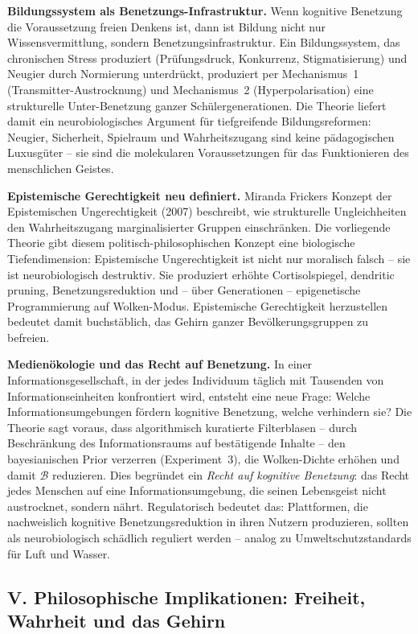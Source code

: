 ﻿\documentclass[12pt,a4paper]{report}
\theoremstyle{plain}
\theoremstyle{definition}
\theoremstyle{remark}
\begin{document}
	\textbf{Bildungssystem als Benetzungs-Infrastruktur.}
	Wenn kognitive Benetzung die Voraussetzung freien Denkens ist,
	dann ist Bildung nicht nur Wissensvermittlung,
	sondern Benetzungsinfrastruktur.
	Ein Bildungssystem, das chronischen Stress produziert
	(Prüfungsdruck, Konkurrenz, Stigmatisierung)
	und Neugier durch Normierung unterdrückt,
	produziert per Mechanismus~1 (Transmitter-Austrocknung)
	und Mechanismus~2 (Hyperpolarisation) eine strukturelle
	Unter-Benetzung ganzer Schülergenerationen.
	Die Theorie liefert damit ein neurobiologisches Argument
	für tiefgreifende Bildungsreformen:
	Neugier, Sicherheit, Spielraum und Wahrheitszugang sind keine
	pädagogischen Luxusgüter -- sie sind die molekularen Voraussetzungen
	für das Funktionieren des menschlichen Geistes.

	\textbf{Epistemische Gerechtigkeit neu definiert.}
	Miranda Frickers Konzept der Epistemischen Ungerechtigkeit
	(2007) beschreibt, wie strukturelle Ungleichheiten den
	Wahrheitszugang marginalisierter Gruppen einschränken.
	Die vorliegende Theorie gibt diesem politisch-philosophischen
	Konzept eine biologische Tiefendimension:
	Epistemische Ungerechtigkeit ist nicht nur moralisch falsch --
	sie ist neurobiologisch destruktiv.
	Sie produziert erhöhte Cortisolspiegel, dendritic pruning,
	Benetzungsreduktion und -- über Generationen -- epigenetische
	Programmierung auf Wolken-Modus.
	Epistemische Gerechtigkeit herzustellen bedeutet damit buchstäblich,
	das Gehirn ganzer Bevölkerungsgruppen zu befreien.

	\textbf{Medienökologie und das Recht auf Benetzung.}
	In einer Informationsgesellschaft, in der jedes Individuum
	täglich mit Tausenden von Informationseinheiten konfrontiert wird,
	entsteht eine neue Frage: Welche Informationsumgebungen fördern
	kognitive Benetzung, welche verhindern sie?
	Die Theorie sagt voraus, dass algorithmisch kuratierte Filterblasen
	-- durch Beschränkung des Informationsraums auf bestätigende Inhalte --
	den bayesianischen Prior verzerren (Experiment~3),
	die Wolken-Dichte erhöhen und damit $\mathcal{B}$ reduzieren.
	Dies begründet ein \emph{Recht auf kognitive Benetzung}:
	das Recht jedes Menschen auf eine Informationsumgebung,
	die seinen Lebensgeist nicht austrocknet, sondern nährt.
	Regulatorisch bedeutet das: Plattformen, die nachweislich
	kognitive Benetzungsreduktion in ihren Nutzern produzieren,
	sollten als neurobiologisch schädlich reguliert werden --
	analog zu Umweltschutzstandards für Luft und Wasser.

	\subsection*{V. Philosophische Implikationen: Freiheit, Wahrheit
		und das Gehirn}
\end{document}
